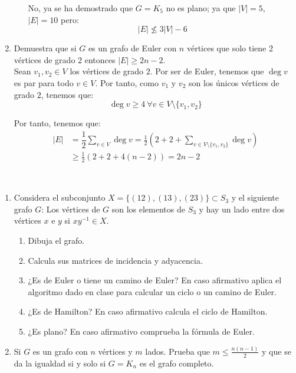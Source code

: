 \begin{ejercicio}
\begin{enumerate}
\begin{enumerate}
            No, ya se ha demostrado que $G=K_5$ no es plano; ya que $|V|=5$, $|E|=10$ pero:
            \begin{equation*}
                |E|\not\leq 3|V|-6
            \end{equation*}
        \end{enumerate}
        \item Demuestra que si $G$ es un grafo de Euler con $n$ vértices que solo tiene 2 vértices de grado 2 entonces $|E|\geq 2n - 2$.\\
        
        Sean $v_1,v_2\in V$ los vértices de grado $2$. Por ser de Euler, tenemos que $\deg v$ es par para todo $v\in V$. Por tanto, como $v_1$ y $v_2$ son los únicos vértices de grado $2$, tenemos que:
        \begin{equation*}
            \deg v\geq 4\ \forall v\in V\setminus\{v_1,v_2\}
        \end{equation*}

        Por tanto, tenemos que:
        \begin{align*}
            |E|&=\dfrac{1}{2}\sum_{v\in V}\deg v 
            = \frac{1}{2}\left(2+2+\sum_{v\in V\setminus\{v_1,v_2\}}\deg v\right)\\
            &\geq \frac{1}{2}\left(2+2+4(n-2)\right)
            = 2n-2
        \end{align*}
    \end{enumerate}
\end{ejercicio}

\begin{ejercicio}\label{ej:1.29}~
    \begin{enumerate}
        \item Considera el subconjunto $X = \{(12),(13),(23)\} \subset S_3$ y el siguiente grafo $G$: Los vértices de $G$ son los elementos de $S_3$ y hay un lado entre dos vértices $x$ e $y$ si $xy^{-1} \in X$.
        \begin{enumerate}
            \item Dibuja el grafo.
            
            \item Calcula sus matrices de incidencia y adyacencia.
            \item ¿Es de Euler o tiene un camino de Euler? En caso afirmativo aplica el algoritmo dado en clase para calcular un ciclo o un camino de Euler.
            \item ¿Es de Hamilton? En caso afirmativo calcula el ciclo de Hamilton.
            \item ¿Es plano? En caso afirmativo comprueba la fórmula de Euler.
        \end{enumerate}
        \item Si $G$ es un grafo con $n$ vértices y $m$ lados. Prueba que $m \leq \frac{n(n-1)}{2}$ y que se da la igualdad si y solo si $G = K_n$ es el grafo completo.
    \end{enumerate}
\end{ejercicio}

